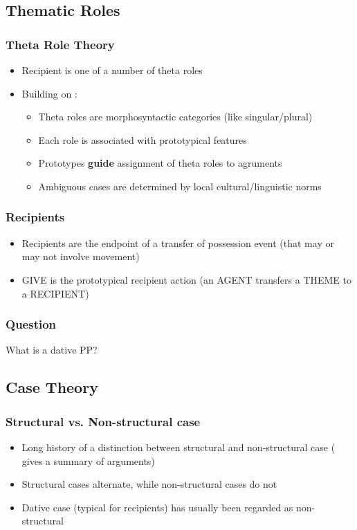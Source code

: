\documentclass{beamer}
\begin{document}
\subsection{Thematic Roles}
\begin{frame}
	\frametitle{Theta Role Theory}
	\begin{itemize}
		\item Recipient is one of a number of theta roles
		\item Building on \cite{Dowty.1991}:
			\begin{itemize}
				\item Theta roles are morphosyntactic categories (like singular/plural)
				\item Each role is associated with prototypical features
				\item Prototypes \textbf{guide} assignment of theta roles to agruments
				\item Ambiguous cases are determined by local cultural/linguistic norms
			\end{itemize}
	\end{itemize}
\end{frame}

\begin{frame}
	\frametitle{Recipients}
	\begin{itemize}
		\item Recipients are the endpoint of a transfer of possession event (that may or may not involve movement)
		\item GIVE is the prototypical recipient action (an AGENT transfers a THEME to a RECIPIENT)
	\end{itemize}
\end{frame}

\begin{frame}
	\frametitle{Question}
	\vfill
	\Large
		What is a dative PP?
	\vfill
\end{frame}
\subsection{Case Theory}
\begin{frame}
	\frametitle{Structural vs. Non-structural case}
	\begin{itemize}
		\item Long history of a distinction between structural and non-structural case (\citet{Woolford.2006} gives a summary of arguments)
		\item Structural cases alternate, while non-structural cases do not
		\item Dative case (typical for recipients) has usually been regarded as non-structural
	\end{itemize}
\end{frame}
\end{document}
